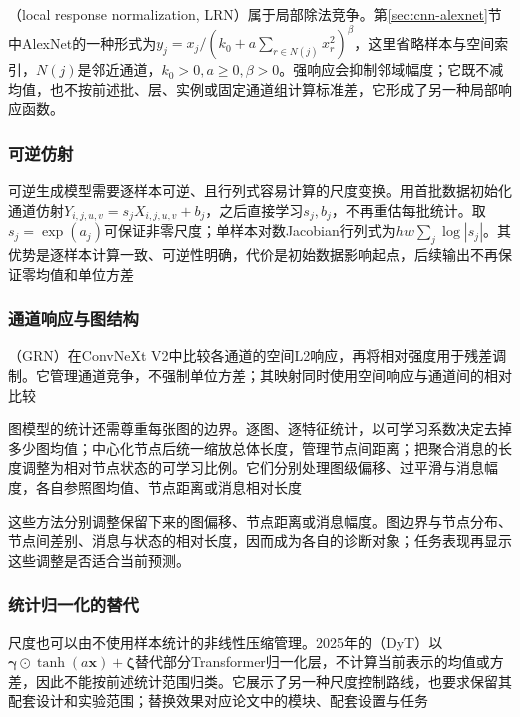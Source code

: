 （local response normalization, LRN）属于局部除法竞争。第\ref{sec:cnn-alexnet}节中AlexNet的一种形式为$y_j=x_j/(k_0+a\sum_{r\in N(j)}x_r^2)^\beta$，这里省略样本与空间索引，$N(j)$是邻近通道，$k_0>0,a\geq0,\beta>0$。强响应会抑制邻域幅度；它既不减均值，也不按前述批、层、实例或固定通道组计算标准差，它形成了另一种局部响应函数。

\subsubsection{可逆仿射}
\label{sec:training-actnorm}
可逆生成模型需要逐样本可逆、且行列式容易计算的尺度变换。用首批数据初始化通道仿射$Y_{i,j,u,v}=s_jX_{i,j,u,v}+b_j$，之后直接学习$s_j,b_j$，不再重估每批统计。取$s_j=\exp(a_j)$可保证非零尺度；单样本对数Jacobian行列式为$hw\sum_j\log|s_j|$。其优势是逐样本计算一致、可逆性明确，代价是初始数据影响起点，后续输出不再保证零均值和单位方差

\subsubsection{通道响应与图结构}
\label{sec:training-grn-qknorm}
\label{sec:training-graph-temporal-norm}
\label{sec:training-global-response-normalization}
（GRN）在ConvNeXt V2中比较各通道的空间L2响应，再将相对强度用于残差调制。它管理通道竞争，不强制单位方差；其映射同时使用空间响应与通道间的相对比较

图模型的统计还需尊重每张图的边界。逐图、逐特征统计，以可学习系数决定去掉多少图均值；中心化节点后统一缩放总体长度，管理节点间距离；把聚合消息的长度调整为相对节点状态的可学习比例。它们分别处理图级偏移、过平滑与消息幅度，各自参照图均值、节点距离或消息相对长度

这些方法分别调整保留下来的图偏移、节点距离或消息幅度。图边界与节点分布、节点间差别、消息与状态的相对长度，因而成为各自的诊断对象；任务表现再显示这些调整是否适合当前预测。

\subsubsection{统计归一化的替代}
\label{sec:training-normalization-substitutes}
尺度也可以由不使用样本统计的非线性压缩管理。2025年的（DyT）以$\bm\gamma\odot\tanh(a\bm x)+\bm\zeta$替代部分Transformer归一化层，不计算当前表示的均值或方差，因此不能按前述统计范围归类。它展示了另一种尺度控制路线，也要求保留其配套设计和实验范围；替换效果对应论文中的模块、配套设置与任务

